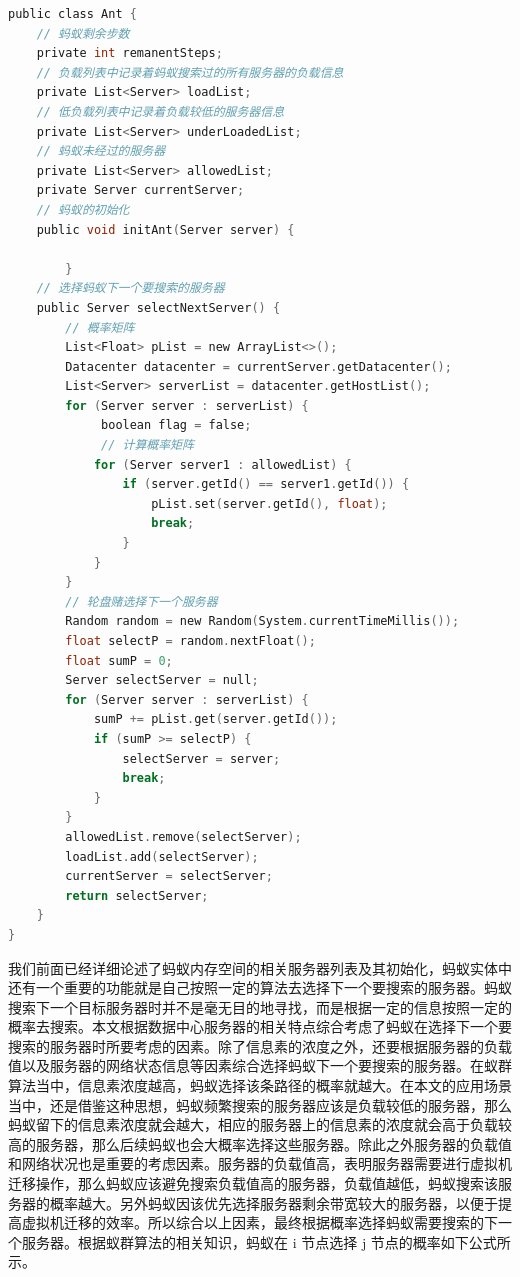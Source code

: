 \begin{lstlisting}[language=C,caption={蚂蚁实体},label=Code:java]
public class Ant {
    // 蚂蚁剩余步数
    private int remanentSteps;
    // 负载列表中记录着蚂蚁搜索过的所有服务器的负载信息
    private List<Server> loadList;
    // 低负载列表中记录着负载较低的服务器信息
    private List<Server> underLoadedList;
    // 蚂蚁未经过的服务器
    private List<Server> allowedList;
    private Server currentServer;
    // 蚂蚁的初始化
    public void initAnt(Server server) {
            
        }
    // 选择蚂蚁下一个要搜索的服务器
    public Server selectNextServer() {
        // 概率矩阵
        List<Float> pList = new ArrayList<>();
        Datacenter datacenter = currentServer.getDatacenter();
        List<Server> serverList = datacenter.getHostList();
        for (Server server : serverList) {
             boolean flag = false;
             // 计算概率矩阵
            for (Server server1 : allowedList) {
                if (server.getId() == server1.getId()) {
                    pList.set(server.getId(), float);
                    break;
                }
            }
        }
        // 轮盘赌选择下一个服务器
        Random random = new Random(System.currentTimeMillis());
        float selectP = random.nextFloat();
        float sumP = 0;
        Server selectServer = null;
        for (Server server : serverList) {
            sumP += pList.get(server.getId());
            if (sumP >= selectP) {
                selectServer = server;
                break;
            }
        }
        allowedList.remove(selectServer);
        loadList.add(selectServer);
        currentServer = selectServer;
        return selectServer;
    }
}
\end{lstlisting}

我们前面已经详细论述了蚂蚁内存空间的相关服务器列表及其初始化，蚂蚁实体中还有一个重要的功能就是自己按照一定的算法去选择下一个要搜索的服务器。蚂蚁搜索下一个目标服务器时并不是毫无目的地寻找，而是根据一定的信息按照一定的概率去搜索。本文根据数据中心服务器的相关特点综合考虑了蚂蚁在选择下一个要搜索的服务器时所要考虑的因素。除了信息素的浓度之外，还要根据服务器的负载值以及服务器的网络状态信息等因素综合选择蚂蚁下一个要搜索的服务器。在蚁群算法当中，信息素浓度越高，蚂蚁选择该条路径的概率就越大。在本文的应用场景当中，还是借鉴这种思想，蚂蚁频繁搜索的服务器应该是负载较低的服务器，那么蚂蚁留下的信息素浓度就会越大，相应的服务器上的信息素的浓度就会高于负载较高的服务器，那么后续蚂蚁也会大概率选择这些服务器。除此之外服务器的负载值和网络状况也是重要的考虑因素。服务器的负载值高，表明服务器需要进行虚拟机迁移操作，那么蚂蚁应该避免搜索负载值高的服务器，负载值越低，蚂蚁搜索该服务器的概率越大。另外蚂蚁因该优先选择服务器剩余带宽较大的服务器，以便于提高虚拟机迁移的效率。所以综合以上因素，最终根据概率选择蚂蚁需要搜索的下一个服务器。根据蚁群算法的相关知识，蚂蚁在 i 节点选择 j 节点的概率如下公式所示。

